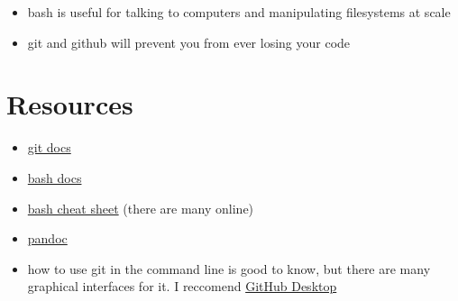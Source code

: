 \documentclass[
]{article}
\providecommand{\tightlist}{%
  \setlength{\itemsep}{0pt}\setlength{\parskip}{0pt}}
\begin{document}
\begin{itemize}
\tightlist
\item
  bash is useful for talking to computers and manipulating filesystems
  at scale
\item
  git and github will prevent you from ever losing your code
\end{itemize}

\hypertarget{resources}{%
\section{Resources}\label{resources}}

\begin{itemize}
\tightlist
\item
  \href{https://git-scm.com/doc}{git docs}
\item
  \href{https://devdocs.io/bash/}{bash docs}
\item
  \href{https://oit.ua.edu/wp-content/uploads/2020/12/Linux_bash_cheat_sheet-1.pdf}{bash
  cheat sheet} (there are many online)
\item
  \href{https://pandoc.org/MANUAL.html}{pandoc}
\item
  how to use git in the command line is good to know, but there are many
  graphical interfaces for it. I reccomend
  \href{https://desktop.github.com}{GitHub Desktop}
\end{itemize}

\printbibliography
\end{document}
